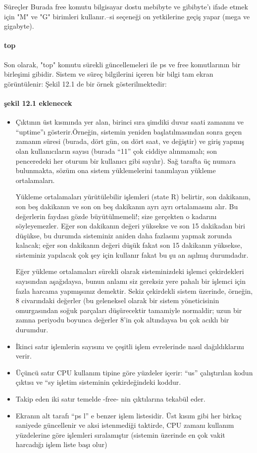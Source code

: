 \begin{section}{Süreçler}
Burada free komutu bilgisayar dostu mebibyte ve gibibyte'ı ifade etmek için "M" ve "G" birimleri kullanır.--si seçeneği on yetkilerine geçiş yapar (mega ve gigabyte).

\paragraph{top}{Son olarak, "top" komutu sürekli güncellemeleri ile ps ve free komutlarının bir birleşimi gibidir. Sistem ve süreç bilgilerini içeren bir bilgi tam ekran görüntülenir: Şekil 12.1 de bir örnek gösterilmektedir:}
\paragraph{şekil 12.1 eklenecek}{}

\begin{itemize}
\item Çıktının üst kısmında yer alan, birinci sıra şimdiki duvar saati zamanını ve “uptime”ı gösterir.Örneğin, sistemin yeniden başlatılmasından sonra geçen zamanın süresi (burada, dört gün, on dört saat, ve değiştir) ve giriş yapmış olan kullanıcıların sayısı (burada “11” çok ciddiye alınmamalı; son penceredeki her oturum bir kullanıcı gibi sayılır). Sağ tarafta üç numara bulunmakta, sözüm ona sistem yüklemelerini tanımlayan yükleme ortalamaları.

Yükleme ortalamaları yürütülebilir işlemleri (state R) belirtir, son dakikanın, son beş dakikanın ve son on beş dakikanın ayrı ayrı ortalamasını alır. Bu değerlerin faydası gözde büyütülmemeli!; size gerçekten o kadarını söyleyemezler. Eğer son dakikanın değeri yüksekse ve son 15 dakikadan biri düşükse, bu durumda sisteminiz aniden daha fazlasını yapmak zorunda kalacak; eğer son dakikanın değeri düşük fakat son 15 dakikanın yüksekse, sisteminiz yapılacak çok şey için kullanır fakat bu şu an aşılmış durumdadır.

Eğer yükleme ortalamaları sürekli olarak sisteminizdeki işlemci çekirdekleri sayısından aşağıdaysa, bunun anlamı siz gereksiz yere pahalı bir işlemci için 
fazla harcama yapmışsınız demektir. Sekiz çekirdekli sistem üzerinde, örneğin, 8 civarındaki değerler (bu geleneksel olarak bir sistem yöneticisinin 	omurgasından soğuk parçaları düşürecektir tamamiyle normaldir; uzun bir zamna periyodu boyunca değerler 8’in çok altındaysa bu çok acıklı bir durumdur.

\item İkinci satır işlemlerin sayısını ve çeşitli işlem evrelerinde nasıl dağıldıklarını verir.
\item Üçüncü satır CPU kullanım tipine göre yüzdeler içerir: “us” çalıştırılan kodun çıktısı ve “sy işletim sisteminin çekirdeğindeki koddur.
\item Takip eden iki satır temelde -free- nin çıktılarına tekabül eder.
\item Ekranın alt tarafı “ps l” e benzer işlem listesidir. Üst kısım gibi her birkaç saniyede güncellenir ve aksi istenmediği taktirde, CPU zamanı kullanım yüzdelerine göre işlemleri sıralamıştır (sistemin üzerinde en çok vakit harcadığı işlem liste başı olur) 


\end{itemize}
\end{section}
